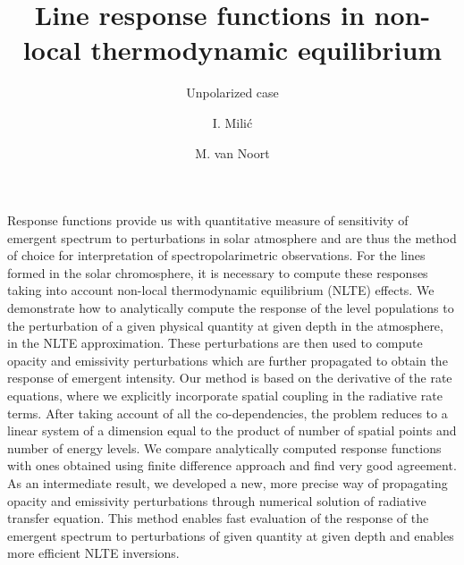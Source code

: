 \documentclass[referee]{aa}
\begin{document}
   \title{Line response functions in non-local thermodynamic equilibrium}

   \subtitle{Unpolarized case}

   \author{I. Mili\'{c}
   \and
   M. van Noort}
   

   \date{}


  \abstract
   {Response functions provide us with quantitative measure of sensitivity of emergent spectrum to perturbations in solar atmosphere and are thus the method of choice for interpretation of spectropolarimetric observations. For the lines formed in the solar chromosphere, it is necessary to compute these responses taking into account non-local thermodynamic equilibrium (NLTE) effects.}  
  {We demonstrate how to analytically compute the response of the level populations to the perturbation of a given physical quantity at given depth in the atmosphere, in the NLTE approximation. These perturbations are then used to compute opacity and emissivity perturbations which are further propagated to obtain the response of emergent intensity.}
   {Our method is based on the derivative of the rate equations, where we explicitly incorporate spatial coupling in the radiative rate terms. After taking account of all the co-dependencies, the problem reduces to a linear system of a dimension equal to the product of number of spatial points and number of energy levels.}
   {We compare analytically computed response functions with ones obtained using finite difference approach and find very good agreement. As an intermediate result, we developed a new, more precise way of propagating opacity and emissivity perturbations through numerical solution of radiative transfer equation.} 
   {This method enables fast evaluation of the response of the emergent spectrum to perturbations of given quantity at given depth and enables more efficient NLTE inversions.}
 
\end{document}
